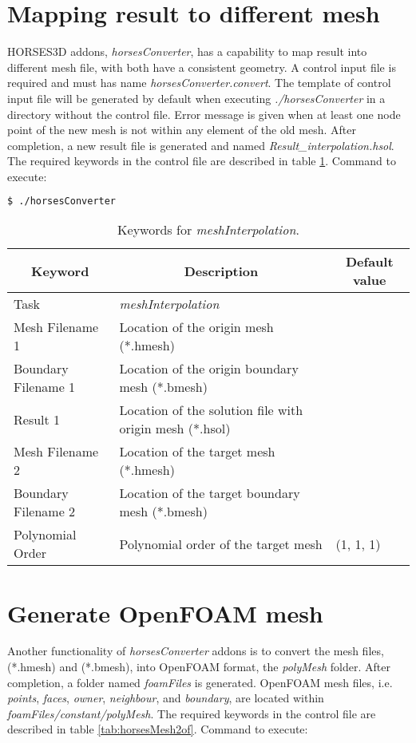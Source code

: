 \documentclass[a4paper,10pt]{report}
\begin{document}
\section{Mapping result to different mesh} \label{tab:meshInterpolation}
HORSES3D addons, \textit{horsesConverter}, has a capability to map result into different mesh file, with both have a consistent geometry.  A control input file is required and must has name \textit{horsesConverter.convert}. The template of control input file will be generated by default when executing \textit{./horsesConverter} in a directory without the control file. Error message is given when at least one node point of the new mesh is not within any element of the old mesh. After completion, a new result file is generated and named \textit{Result\_interpolation.hsol}. The required keywords in the control file are described in table \ref{tab:mappingresult}. Command to execute:

\begin{lstlisting}[language=bash]
	$ ./horsesConverter
\end{lstlisting}

\begin{longtable}{|p{4cm}|p{10cm}|p{2.2cm}|}
\caption{Keywords for \textit{meshInterpolation}.} \label{tab:mappingresult} \\
\hline
\multicolumn{1}{|c|}{\textbf{Keyword}} & \multicolumn{1}{c|}{\textbf{Description}} & \multicolumn{1}{c|}{\textbf{Default value}} \\ \hline
\endfirsthead

Task 	        		& \textit{meshInterpolation} 						&  \\ \hline
Mesh Filename 1 		& Location of the origin mesh (*.hmesh) 	&  \\ \hline
Boundary Filename 1 	& Location of the origin boundary mesh (*.bmesh) 	&  \\ \hline
Result 1 			& Location of the solution file with origin mesh (*.hsol) 	&  \\ \hline
Mesh Filename 2 		& Location of the target mesh (*.hmesh) 	&  \\ \hline
Boundary Filename 2 	& Location of the target boundary mesh (*.bmesh) 	&  \\ \hline
Polynomial Order 	& Polynomial order of the target mesh 	& (1, 1, 1) \\ \hline
\end{longtable}

\section{Generate OpenFOAM mesh} \label{tab:horsesMesh2OF}
Another functionality of \textit{horsesConverter} addons is to convert the mesh files, (*.hmesh) and (*.bmesh), into OpenFOAM format, the \textit{polyMesh} folder. After completion, a folder named \emph{foamFiles} is generated. OpenFOAM mesh files, i.e. \textit{points}, \textit{faces}, \textit{owner}, \textit{neighbour}, and \textit{boundary}, are located within \emph{foamFiles/constant/polyMesh}. The required keywords in the control file are described in table \ref{tab:horsesMesh2of}. Command to execute:
\end{document}
